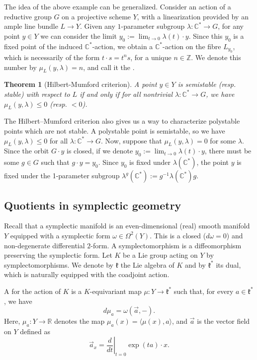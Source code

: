 \documentclass[12pt,a4paper]{amsbook}
\newtheorem{thm}{Theorem}[chapter]
\theoremstyle{remark} \newtheorem{rmk}[thm]{Remark}
\theoremstyle{definition} \newtheorem{defn}[thm]{Definition}
\theoremstyle{definition} \newtheorem{ex}[thm]{Example}
\theoremstyle{definition} \newtheorem{ej}{Exercise}
\let\emph\relax
\newcommand{\C}{\mathbb C}
\newcommand{\Z}{\mathbb Z}
\newcommand{\bbR}{\mathbb R}
\newcommand{\fk}{\mathfrak k}
\begin{document}
The idea of the above example can be generalized. Consider an action of a reductive group $G$ on a projective scheme $Y$, with a linearization provided by an ample line bundle $L\rightarrow Y$. Given any $1$-parameter subgroup $\lambda:\C^*\rightarrow G$, for any point $y\in Y$ we can consider the limit $y_0 := \lim_{t\rightarrow 0} \lambda(t)\cdot y$. Since this $y_0$ is a fixed point of the induced $\C^*$-action, we obtain a $\C^*$-action on the fibre $L_{y_0}$, which is necessarily of the form $t \cdot s = t^n s$, for a unique $n\in \Z$. We denote this number by $\mu_L(y,\lambda)=n$, and call it the \emph{Hilbert-Mumford weight}.

\begin{thm}[Hilbert-Mumford criterion]
  A point $y\in Y$ is semistable (resp. stable) with respect to $L$ if and only if for all nontrivial $\lambda:\C^* \rightarrow G$, we have $\mu_L(y,\lambda) \leq 0$ (resp. $<0$).
\end{thm}

The Hilbert--Mumford criterion also gives us a way to characterize polystable points which are not stable. A polystable point is semistable, so we have $\mu_L(y,\lambda)\leq 0$ for all $\lambda:\C^* \rightarrow G$. Now, suppose that $\mu_L(y,\lambda)=0$ for some $\lambda$. Since the orbit $G\cdot y$ is closed, if we denote $y_0:=\lim_{t\rightarrow 0} \lambda(t)\cdot y$, there must be some $g\in G$ such that $g\cdot y = y_0$. Since $y_0$ is fixed under $\lambda(\C^*)$, the point $y$ is fixed under the 1-parameter subgroup $\lambda^g(\C^*):= g^{-1} \lambda(\C^*) g$.


\subsection*{Quotients in symplectic geometry}
Recall that a symplectic manifold is an even-dimensional (real) smooth manifold $Y$ equipped with a symplectic form $\omega \in \Omega^2(Y)$. This is a closed ($d\omega = 0$) and non-degenerate differential $2$-form. A symplectomorphism is a diffeomorphism preserving the symplectic form. Let $K$ be a Lie group acting on $Y$ by symplectomorphisms. We denote by $\fk$ the Lie algebra of $K$ and by $\fk^*$ its dual, which is naturally equipped with the coadjoint action.

A \emph{moment map} for the action of $K$ is a $K$-equivariant map $\mu:Y\rightarrow \fk^*$ such that, for every $a\in \fk^*$, we have
\begin{equation*}
d \mu_a = \omega(\vec{a},-).
\end{equation*}
Here, $\mu_a:Y\rightarrow \bbR$ denotes the map $\mu_a(x)=\langle \mu(x), a \rangle$, and $\vec{a}$ is the vector field on $Y$ defined as
\begin{equation*}
\vec{a}_x = \left. \frac{d}{dt}\right|_{t=0} \exp(t a) \cdot x.
\end{equation*}
\end{document}

